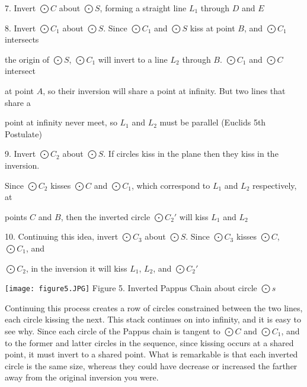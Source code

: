 \documentclass[12pt]{article}
\begin{document}
7. Invert $\bigodot{C}$ about $\bigodot{S}$, forming a straight line $L_1$ through $D$ and $E$

8. Invert $\bigodot{C_1}$ about $\bigodot{S}$. Since $\bigodot{C_1}$ and $\bigodot{S}$ kiss at point $B$, and $\bigodot{C_1}$ intersects 

\hspace{15}the origin of $\bigodot{S}$, $\bigodot{C_1}$ will invert to a line $L_2$ through $B$. $\bigodot{C_1}$ and $\bigodot{C}$ intersect  

\hspace{15}at point $A$, so their inversion will share a point at infinity. But two lines that share a  

\hspace{15}point at infinity never meet, so $L_1$ and $L_2$ must be parallel (Euclids 5th Postulate)

9. Invert $\bigodot{C_2}$ about $\bigodot{S}$. If circles kiss in the plane then they kiss in the inversion.  

\hspace{15}Since $\bigodot{C_2}$ kisses $\bigodot{C}$ and $\bigodot{C_1}$, which correspond to $L_1$ and $L_2$ respectively, at  

\hspace{15}points $C$ and $B$, then the inverted circle $\bigodot{C_{2}'}$ will kiss $L_1$ and $L_2$

10. Continuing this idea, invert  $\bigodot{C_3}$ about $\bigodot{S}$. Since  $\bigodot{C_3}$ kisses $\bigodot{C}$, $\bigodot{C_1}$, and 

\hspace{15}$\bigodot{C_2}$, in the inversion it will kiss $L_1$, $L_2$, and $\bigodot{C_{2}'}$

\begin{center}
    \texttt{[image: figure5.JPG]}
    Figure 5. Inverted Pappus Chain about circle $\bigodot{s}$
\end{center}

Continuing this process creates a row of circles constrained between the two lines, each circle kissing the next. This stack continues on into infinity, and it is easy to see why. Since each circle of the Pappus chain is tangent to $\bigodot{C}$ and $\bigodot{C_1}$, and to the former and latter circles in the sequence, since kissing occurs at a shared point, it must invert to a shared point. What is remarkable is that each inverted circle is the same size, whereas they could have decrease or increased the farther away from the original inversion you were. 
   
\end{document}
